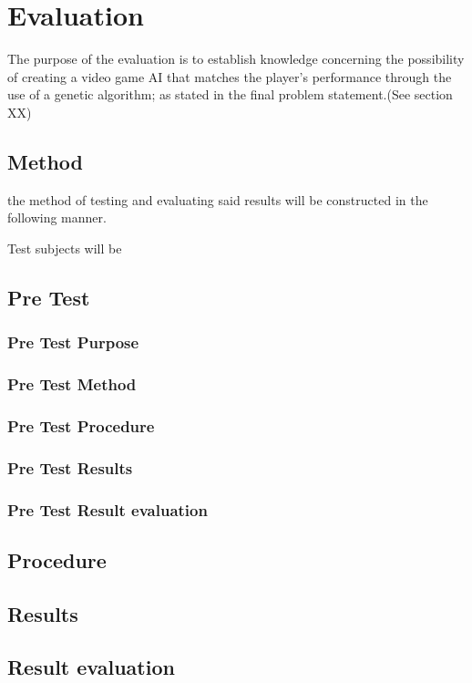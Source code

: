 \section{Evaluation} \label{sec:evaluation}
The purpose of the evaluation is to establish knowledge concerning the possibility of creating a video game AI that matches the player's performance through the use of a genetic algorithm; as stated in the final problem statement.(See section XX)


\subsection{Method}
the method of testing and evaluating said results will be constructed in the following manner.

Test subjects will be 

\subsection{Pre Test}

\subsubsection{Pre Test Purpose}
\subsubsection{Pre Test Method}
\subsubsection{Pre Test Procedure}
\subsubsection{Pre Test Results}
\subsubsection{Pre Test Result evaluation}

\subsection{Procedure}
\subsection{Results}
\subsection{Result evaluation}